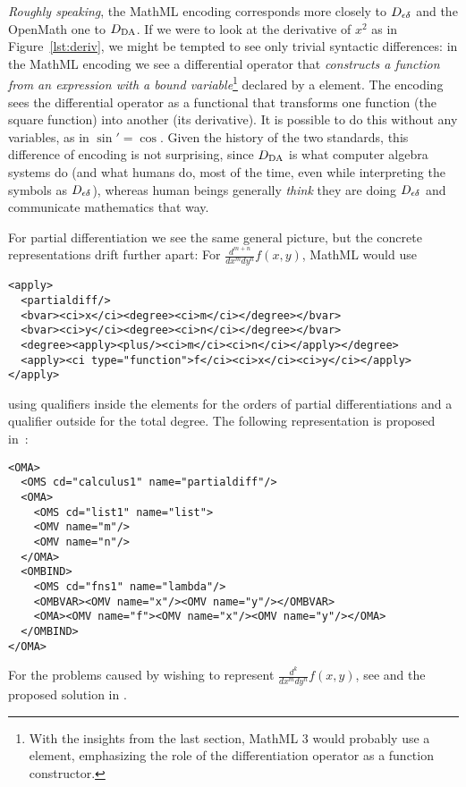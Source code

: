 \documentclass{llncs}
\begin{document}
{\emph{Roughly speaking}}, the MathML encoding corresponds more closely to $D_{\epsilon\delta}$ and the
OpenMath one to $D_{\rm DA}$. If we were to look at the derivative of $x^2$ as in
Figure~\ref{lst:deriv}, we might be tempted to see only trivial syntactic differences: in
the MathML encoding we see a differential operator that {\emph{constructs a function from
    an expression with a bound variable}}\footnote{With the insights from the last
  section, MathML 3 would probably use a {} element, emphasizing the role of
  the differentiation operator as a function constructor.} declared by a {}
element.  The {\openmath} encoding sees the differential operator as a functional that
transforms one function (the square function) into another (its derivative).  It is
possible to do this without any variables, as in $\sin'=\cos$.  Given the history of the
two standards, this difference of encoding is not surprising, since $D_{\rm DA}$ is what
computer algebra systems do (and what humans do, most of the time, even while interpreting
the symbols as $D_{\epsilon\delta}$), whereas human beings generally {\em think\/} they are doing $D_{\epsilon\delta}$ and
communicate mathematics that way.

For partial differentiation we see the same general picture, but the concrete
representations drift further apart: For $\frac{d^{m+n}}{dx^m dy^n}f(x,y)$, MathML would
use
\begin{lstlisting}[language=MathML2]
<apply>
  <partialdiff/>
  <bvar><ci>x</ci><degree><ci>m</ci></degree></bvar>
  <bvar><ci>y</ci><degree><ci>n</ci></degree></bvar>
  <degree><apply><plus/><ci>m</ci><ci>n</ci></apply></degree>
  <apply><ci type="function">f</ci><ci>x</ci><ci>y</ci></apply>
</apply>
\end{lstlisting}
using {} qualifiers inside the {} elements for the orders of
partial differentiations and a {} qualifier outside for the total
degree. The following representation is proposed in~\cite{CarDAvDew:cbmao01}:
\begin{lstlisting}[language=OpenMath]
<OMA>
  <OMS cd="calculus1" name="partialdiff"/>
  <OMA>
    <OMS cd="list1" name="list">
    <OMV name="m"/>
    <OMV name="n"/>
  </OMA>
  <OMBIND>
    <OMS cd="fns1" name="lambda"/>
    <OMBVAR><OMV name="x"/><OMV name="y"/></OMBVAR>
    <OMA><OMV name="f"><OMV name="x"/><OMV name="y"/></OMA>
  </OMBIND>
</OMA>
\end{lstlisting}
For the problems caused by wishing to represent $\frac{d^k}{dx^m dy^n}f(x,y)$, see
\cite{Kohlhase2008} and the proposed solution in \cite{DavenportKohlhase2009d}.
\end{document}
